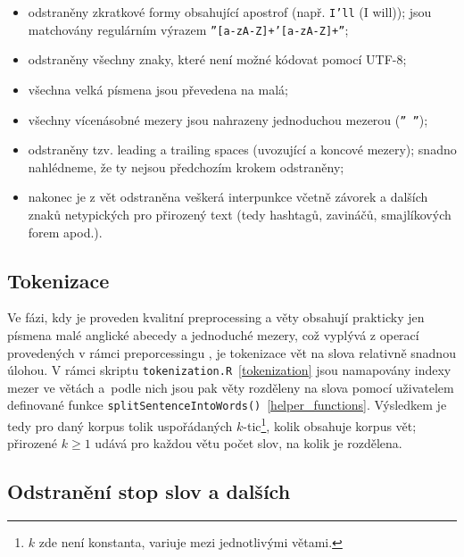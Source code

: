 \begin{itemize}
  \item odstraněny zkratkové formy obsahující apostrof (např. \texttt{I'll}
  (I will)); jsou matchovány regulárním výrazem
  \texttt{''[a-zA-Z]+'[a-zA-Z]+''};
  \item odstraněny všechny znaky, které není možné kódovat pomocí UTF-8;
  \item všechna velká písmena jsou převedena na malá;
  \item všechny vícenásobné mezery jsou nahrazeny jednoduchou
  mezerou (\texttt{'' ''});
  \item odstraněny tzv. leading a trailing
  spaces (uvozující a koncové
  mezery); snadno nahlédneme, že ty nejsou předchozím krokem odstraněny;
  \item nakonec je z vět odstraněna veškerá interpunkce včetně závorek
  a dalších znaků netypických pro přirozený text (tedy hashtagů, zavináčů,
  smajlíkových forem apod.).
\end{itemize}


\subsection{Tokenizace}

Ve fázi, kdy je proveden kvalitní preprocessing
a věty obsahují prakticky
jen písmena malé anglické abecedy a jednoduché mezery, což vyplývá z operací
provedených v rámci preporcessingu%
, je tokenizace vět na slova relativně
snadnou úlohou. V rámci skriptu \texttt{tokenization.R}~\ref{tokenization}
jsou namapovány indexy mezer ve větách a~podle nich jsou pak věty rozděleny
na slova pomocí uživatelem definované funkce
\texttt{splitSentenceIntoWords()}~\ref{helper_functions}. Výsledkem je tedy
pro daný korpus tolik uspořádaných $k$-tic\footnote{$k$ zde není konstanta,
variuje mezi jednotlivými větami.}, kolik obsahuje korpus vět; přirozené
$k \geq 1$ udává pro každou větu počet slov, na kolik je rozdělena.



\subsection{Odstranění stop slov a dalších}

